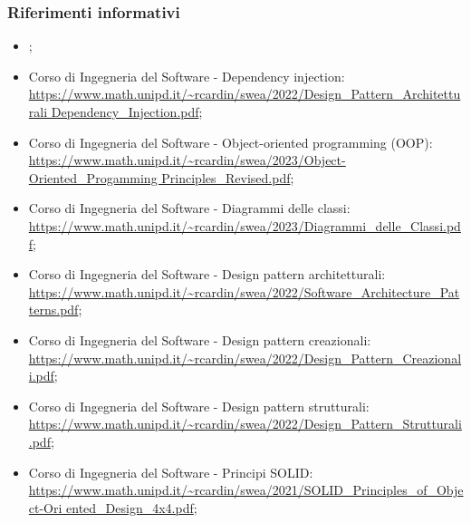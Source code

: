 \subsubsection{Riferimenti informativi}
\begin{itemize}
  \item \AnalisiDeiRequisiti;
  \item Corso di Ingegneria del Software - Dependency injection:\\ \href{https://www.math.unipd.it/~rcardin/swea/2022/Design%20Pattern%20Architetturali%20-%20Dependency%20Injection.pdf}{https://www.math.unipd.it/\textasciitilde rcardin/swea/2022/Design\_Pattern\_Architetturali \- Dependency\_Injection.pdf};
  \item Corso di Ingegneria del Software - Object-oriented programming (OOP):\\ \href{https://www.math.unipd.it/~rcardin/swea/2023/Object-Oriented%20Progamming%20Principles%20Revised.pdf}{https://www.math.unipd.it/\textasciitilde rcardin/swea/2023/Object-Oriented\_Progamming \- Principles\_Revised.pdf};
  \item Corso di Ingegneria del Software - Diagrammi delle classi:\\ \href{https://www.math.unipd.it/~rcardin/swea/2023/Diagrammi%20delle%20Classi.pdf}{https://www.math.unipd.it/\textasciitilde rcardin/swea/2023/Diagrammi\_delle\_Classi.pdf};
  \item Corso di Ingegneria del Software - Design pattern architetturali:\\ \href{https://www.math.unipd.it/~rcardin/swea/2022/Software%20Architecture%20Patterns.pdf}{https://www.math.unipd.it/\textasciitilde rcardin/swea/2022/Software\_Architecture\_Patterns.pdf};
  \item Corso di Ingegneria del Software - Design pattern creazionali:\\ \href{https://www.math.unipd.it/~rcardin/swea/2022/Design%20Pattern%20Creazionali.pdf}{https://www.math.unipd.it/\textasciitilde rcardin/swea/2022/Design\_Pattern\_Creazionali.pdf};
  \item Corso di Ingegneria del Software - Design pattern strutturali:\\ \href{https://www.math.unipd.it/~rcardin/swea/2022/Design%20Pattern%20Strutturali.pdf}{https://www.math.unipd.it/\textasciitilde rcardin/swea/2022/Design\_Pattern\_Strutturali.pdf};
  \item Corso di Ingegneria del Software - Principi SOLID:\\ \href{https://www.math.unipd.it/~rcardin/swea/2021/SOLID%20Principles%20of%20Object-Oriented%20Design_4x4.pdf}{https://www.math.unipd.it/\textasciitilde rcardin/swea/2021/SOLID\_Principles\_of\_Object-Ori \- ented\_Design\_4x4.pdf};

\end{itemize}
